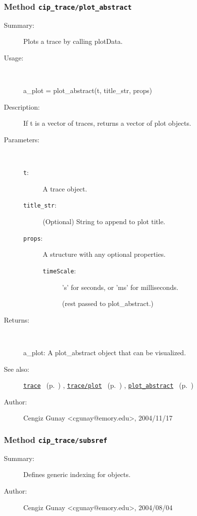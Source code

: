 \subsubsection[Method \texttt{plot\_abstract}]{Method \texttt{cip\_trace/plot\_abstract}}%
%
\label{ref_cip_trace__plot_abstract}%
\hypertarget{ref_cip_trace__plot_abstract}{}%
\begin{description}
\item[Summary:]Plots a trace by calling plotData.
%
\item[Usage:]~%
\begin{lyxcode}%
a\_plot = plot\_abstract(t, title\_str, props)
%
\end{lyxcode}%
%
\item[Description:]%
If t is a vector of traces, returns a vector of plot objects.
\item[Parameters:]~
\begin{description}%
\item[\texttt{t}:]
 A trace object.
\item[\texttt{title\_str}:]
 (Optional) String to append to plot title.
\item[\texttt{props}:]
 A structure with any optional properties.
\begin{description}%
\item[\texttt{timeScale}:]
 's' for seconds, or 'ms' for milliseconds.

(rest passed to plot\_abstract.)\end{description}%
\end{description}%
%
\item[Returns:]~

	a\_plot: A plot\_abstract object that can be visualized.
%
%
\item[See also:]%
\hyperlink{ref_trace}{\texttt{trace}}%
\ (p.~\pageref{ref_trace})%
%
, \hyperlink{ref_trace__plot}{\texttt{trace/plot}}%
\ (p.~\pageref{ref_trace__plot})%
%
, \hyperlink{ref_plot_abstract}{\texttt{plot\_abstract}}%
\ (p.~\pageref{ref_plot_abstract})%
%
%
\item[Author:]%
Cengiz Gunay <cgunay@emory.edu>, 2004/11/17%
\end{description}
\methodline%
\subsubsection[Method \texttt{subsref}]{Method \texttt{cip\_trace/subsref}}%
%
\label{ref_cip_trace__subsref}%
\hypertarget{ref_cip_trace__subsref}{}%
\begin{description}
\item[Summary:]Defines generic indexing for objects.
%
%
%
%
%
%
%
\item[Author:]%
Cengiz Gunay <cgunay@emory.edu>, 2004/08/04%
\end{description}
\methodline%
